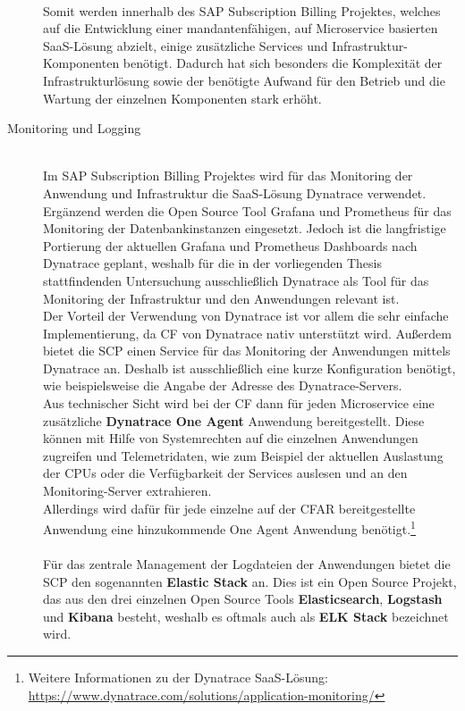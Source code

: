 \begin{description}
	\\
	Somit werden innerhalb des SAP Subscription Billing Projektes, welches auf die Entwicklung einer mandantenfähigen, auf Microservice basierten \ac{SaaS}-Lösung abzielt, einige zusätzliche Services und Infrastruktur-Komponenten benötigt. Dadurch hat sich besonders die Komplexität der Infrastrukturlösung sowie der benötigte Aufwand für den Betrieb und die Wartung der einzelnen Komponenten stark erhöht.\\ 
	\item[Monitoring und Logging] \hfill \\
	Im SAP Subscription Billing Projektes wird für das Monitoring der Anwendung und Infrastruktur die \ac{SaaS}-Lösung Dynatrace verwendet. Ergänzend werden die Open Source Tool Grafana und Prometheus für das Monitoring der Datenbankinstanzen eingesetzt. Jedoch ist die langfristige Portierung der aktuellen Grafana und Prometheus Dashboards nach Dynatrace geplant, weshalb für die in der vorliegenden Thesis stattfindenden Untersuchung ausschließlich Dynatrace als Tool für das Monitoring der Infrastruktur und den Anwendungen relevant ist.\\
	Der Vorteil der Verwendung von Dynatrace ist vor allem die sehr einfache Implementierung, da \ac{CF} von Dynatrace nativ unterstützt wird.\autocite[Vgl.][]{DynatraceLLC.2020} 
	\newpage
	Außerdem bietet die \ac{SCP} einen Service für das Monitoring der Anwendungen mittels Dynatrace an. Deshalb ist ausschließlich eine kurze Konfiguration benötigt, wie beispielsweise die Angabe der Adresse des Dynatrace-Servers.\autocite[Vgl.][]{DynatraceLLC.2020b}\\ 
	Aus technischer Sicht wird bei der \ac{CF} dann für jeden Microservice eine zusätzliche \textbf{ Dynatrace One Agent} Anwendung bereitgestellt. Diese können mit Hilfe von Systemrechten auf die einzelnen Anwendungen zugreifen und Telemetridaten, wie zum Beispiel der aktuellen Auslastung der \acsp{CPU} oder die Verfügbarkeit der Services auslesen und an den Monitoring-Server extrahieren.\\
	Allerdings wird dafür für jede einzelne auf der \ac{CFAR} bereitgestellte Anwendung eine hinzukommende One Agent Anwendung benötigt.\footnote{Weitere Informationen zu der Dynatrace \ac{SaaS}-Lösung: \url{https://www.dynatrace.com/solutions/application-monitoring/}}\\
	\\
	Für das zentrale Management der Logdateien der Anwendungen bietet die \ac{SCP} den sogenannten \textbf{Elastic Stack} an. Dies ist ein Open Source Projekt, das aus den drei einzelnen Open Source Tools \textbf{Elasticsearch}, \textbf{Logstash} und \textbf{Kibana} besteht, weshalb es oftmals auch als \textbf{ELK Stack} bezeichnet wird.\\

\end{description}
